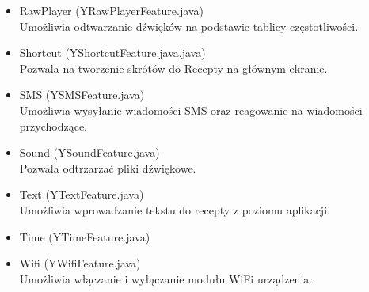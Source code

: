 \documentclass[11pt,a4paper,polish,thesis]{dcsbook}
\begin{document}
\begin{itemize}
\item{RawPlayer (YRawPlayerFeature.java)}\\
Umożliwia odtwarzanie dźwięków na podstawie tablicy częstotliwości.

\item{Shortcut (YShortcutFeature.java.java)}\\
Pozwala na tworzenie skrótów do Recepty na głównym ekranie.

\item{SMS (YSMSFeature.java)}\\
Umożliwia wysyłanie wiadomości SMS oraz reagowanie na wiadomości przychodzące.

\item{Sound (YSoundFeature.java)}\\
Pozwala odtrzarzać pliki dźwiękowe.

\item{Text (YTextFeature.java)}\\
Umożliwia wprowadzanie tekstu do recepty z poziomu aplikacji.

\item{Time (YTimeFeature.java)}\\

\item{Wifi (YWifiFeature.java)}\\
Umożliwia włączanie i wyłączanie modułu WiFi urządzenia.

\end{itemize}
\end{document}
